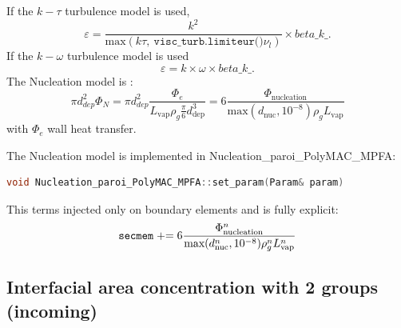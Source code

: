 If the $k-\tau$ turbulence model is used,
\begin{equation}
\varepsilon=\frac{k^2}{\text{max}(k\tau,\ \texttt{visc_turb.limiteur()} \nu_l)}\times beta\_ k \_.
\end{equation}
If the $k-\omega$ turbulence model is used
\begin{equation}
\varepsilon=k\times \omega\times beta\_ k \_.
\end{equation}
The {\colorbox{codebackground}{\color{codekeyword3}  Nucleation}} model is :
\begin{equation}
		\pi d_{dep}^2\Phi_N = \pi d_{dep}^2\frac{\Phi_{e}}{L_{\text{vap}} \rho_g \frac{\pi}{6}d_\text{dep}^3}=6\frac{\Phi_{\text{nucleation}}}{\text{max}(d_{\text{nuc}},10^{-8})\rho_g L_{\text{vap}}}
\end{equation}
with $\Phi_{e}$ wall heat transfer.

The {\colorbox{codebackground}{\color{codekeyword3}  Nucleation}} model is implemented in Nucleation_paroi_PolyMAC_MPFA:
\begin{lstlisting}[language=c++]
void Nucleation_paroi_PolyMAC_MPFA::set_param(Param& param)
\end{lstlisting}
This terms injected only on boundary elements and is fully explicit:
\begin{equation}
    \texttt{secmem} \mathrel{+}= 6\frac{\Phi_{\text{nucleation}}^n}{\text{max}(d_{\text{nuc}}^n,10^{-8})\rho_g^n L_{\text{vap}}^n}
\end{equation}

\subsection{Interfacial area concentration with 2 groups (incoming)}

%
